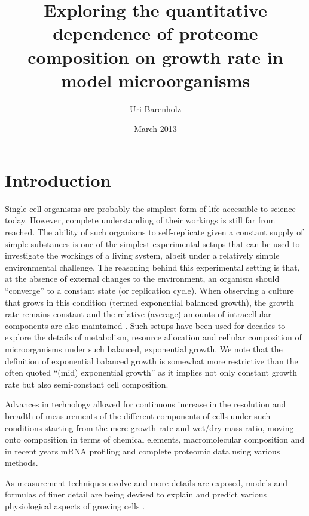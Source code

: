 \documentclass{report}
\title{Exploring the quantitative dependence of proteome composition on growth rate in model microorganisms}
\author{Uri Barenholz}
\date{March 2013}
\begin{document}
\maketitle
\tableofcontents

\section{Introduction}
Single cell organisms are probably the simplest form of life accessible to science today.
However, complete understanding of their workings is still far from reached.
The ability of such organisms to self-replicate given a constant supply of simple substances is one of the simplest experimental setups that can be used to investigate the workings of a living system, albeit under a relatively simple environmental challenge.
The reasoning behind this experimental setting is that, at the absence of external changes to the environment, an organism should “converge” to a constant state (or replication cycle).
When observing a culture that grows in this condition (termed exponential balanced growth), the growth rate remains constant and the relative (average) amounts of intracellular components are also maintained \cite{Campbell1957}.
Such setups have been used for decades \cite{Schaechter1958,Maaloe1969,Pedersen1978a} to explore the details of metabolism, resource allocation and cellular composition of microorganisms under such balanced, exponential growth.
We note that the definition of exponential balanced growth is somewhat more restrictive than the often quoted ``(mid) exponential growth'' as it implies not only constant growth rate but also semi-constant cell composition.

Advances in technology allowed for continuous increase in the resolution and breadth of measurements of the different components of cells under such conditions starting from the mere growth rate and wet/dry mass ratio, moving onto composition in terms of chemical elements, macromolecular composition and in recent years mRNA profiling and complete proteomic data using various methods.

As measurement techniques evolve and more details are exposed, models and formulas of finer detail are being devised to explain and predict various physiological aspects of growing cells \cite{Scott2010a,Lerman2012,Karr2012}.
\end{document}
